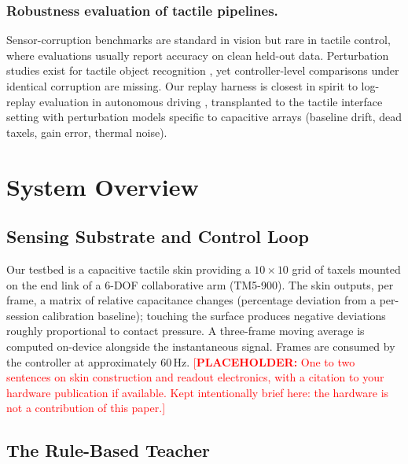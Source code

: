 \documentclass[runningheads]{llncs}
\newcommand{\placeholder}[1]{\textcolor{red}{[\textbf{PLACEHOLDER:} #1]}}
\begin{document}
\subsubsection{Robustness evaluation of tactile pipelines.}
Sensor-corruption benchmarks are standard in vision
\cite{hendrycks2019robustness} but rare in tactile control, where
evaluations usually report accuracy on clean held-out data.  Perturbation
studies exist for tactile object recognition \cite{taunyazov2019tactile},
yet controller-level comparisons under identical corruption are missing.
Our replay harness is closest in spirit to log-replay evaluation in
autonomous driving \cite{caesar2020nuscenes}, transplanted to the tactile
interface setting with perturbation models specific to capacitive arrays
(baseline drift, dead taxels, gain error, thermal noise).

\section{System Overview}
\label{sec:system}

\subsection{Sensing Substrate and Control Loop}

Our testbed is a capacitive tactile skin providing a $10\times10$ grid of
taxels mounted on the end link of a 6-DOF collaborative arm (TM5-900).
The skin outputs, per frame, a matrix of relative capacitance changes
(percentage deviation from a per-session calibration baseline); touching
the surface produces negative deviations roughly proportional to contact
pressure.  A three-frame moving average is computed on-device alongside
the instantaneous signal.  Frames are consumed by the controller at
approximately 60\,Hz.
\placeholder{One to two sentences on skin construction and readout
electronics, with a citation to your hardware publication if available.
Kept intentionally brief here: the hardware is not a contribution of this
paper.}

\subsection{The Rule-Based Teacher}
\label{sec:teacher}
\end{document}
